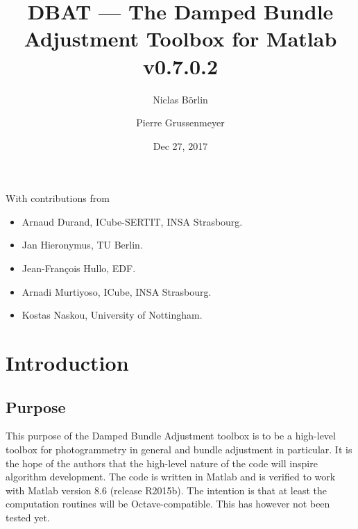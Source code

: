 \documentclass{article}
\begin{document}


\newcommand{\dbatversion}{0.7.0.2}
\newcommand{\dbatdate}{Dec 27, 2017}

\title{DBAT --- The Damped Bundle Adjustment Toolbox for Matlab\\\Large v\dbatversion{}}

\author[1]{Niclas B{\"o}rlin}
\author[2]{Pierre Grussenmeyer}
\date{\dbatdate}

\maketitle

\vfill
With contributions from
\begin{itemize}
\item Arnaud Durand, ICube-SERTIT, INSA Strasbourg.
\item Jan Hieronymus, TU Berlin.
\item Jean-Fran{\c{c}}ois Hullo, EDF.
\item Arnadi Murtiyoso, ICube, INSA Strasbourg.
\item Kostas Naskou, University of Nottingham.
\end{itemize}
\newpage

\tableofcontents

\newpage

\section{Introduction}

\subsection{Purpose}

This purpose of the Damped Bundle Adjustment toolbox is to be a
high-level toolbox for photogrammetry in general and bundle adjustment
in particular. It is the hope of the authors that the high-level
nature of the code will inspire algorithm development. The code is
written in Matlab and is verified to work with Matlab version 8.6
(release R2015b). The intention is that at least the computation
routines will be Octave-compatible. This has however not been tested
yet.
\end{document}

